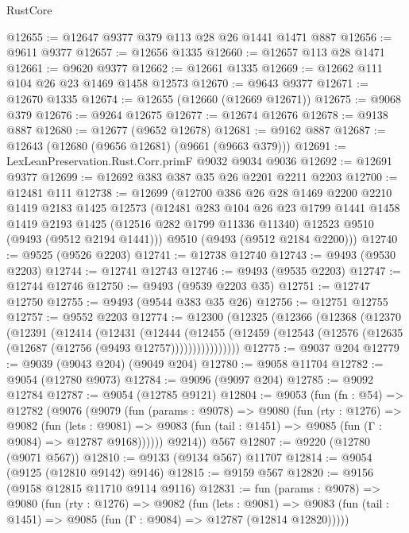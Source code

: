 \begin{lexlean}{RustCore}
\begin{coremodule}
@12655 := @12647 @9377 @379 @113 @28 @26 @1441 @1471 @887
@12656 := @9611 @9377
@12657 := @12656 @1335
@12660 := @12657 @113 @28 @1471
@12661 := @9620 @9377
@12662 := @12661 @1335
@12669 := @12662 @111 @104 @26 @23 @1469 @1458 @12573
@12670 := @9643 @9377
@12671 := @12670 @1335
@12674 := @12655 (@12660 (@12669 @12671))
@12675 := @9068 @379
@12676 := @9264 @12675
@12677 := @12674 @12676
@12678 := @9138 @887
@12680 := @12677 (@9652 @12678)
@12681 := @9162 @887
@12687 := @12643 (@12680 (@9656 @12681) (@9661 (@9663 @379)))
@12691 := LexLeanPreservation.Rust.Corr.primF @9032 @9034 @9036
@12692 := @12691 @9377
@12699 := @12692 @383 @387 @35 @26 @2201 @2211 @2203
@12700 := @12481 @111
@12738 := @12699
    (@12700
      @386
      @26
      @28
      @1469
      @2200
      @2210
      @1419
      @2183
      @1425
      @12573
      (@12481
        @283
        @104
        @26
        @23
        @1799
        @1441
        @1458
        @1419
        @2193
        @1425
        (@12516 @282 @1799 @11336 @11340)
        @12523
        @9510
        (@9493 (@9512 @2194 @1441)))
      @9510
      (@9493 (@9512 @2184 @2200)))
@12740 := @9525 (@9526 @2203)
@12741 := @12738 @12740
@12743 := @9493 (@9530 @2203)
@12744 := @12741 @12743
@12746 := @9493 (@9535 @2203)
@12747 := @12744 @12746
@12750 := @9493 (@9539 @2203 @35)
@12751 := @12747 @12750
@12755 := @9493 (@9544 @383 @35 @26)
@12756 := @12751 @12755
@12757 := @9552 @2203
@12774 := @12300
    (@12325
      (@12366
        (@12368
          (@12370
            (@12391
              (@12414
                (@12431
                  (@12444
                    (@12455
                      (@12459 (@12543 (@12576 (@12635 (@12687 (@12756 (@9493 @12757))))))))))))))))
@12775 := @9037 @204
@12779 := @9039 (@9043 @204) (@9049 @204)
@12780 := @9058 @11704
@12782 := @9054 (@12780 @9073)
@12784 := @9096 (@9097 @204)
@12785 := @9092 @12784
@12787 := @9054 (@12785 @9121)
@12804 := @9053
    (fun (fn : @54) =>
    @12782
      (@9076
        (@9079
          (fun (params : @9078) =>
          @9080
            (fun (rty : @1276) =>
            @9082
              (fun (lets : @9081) =>
              @9083 (fun (tail : @1451) => @9085 (fun (Γ : @9084) => @12787 @9168))))))
        @9214))
    @567
@12807 := @9220 (@12780 (@9071 @567))
@12810 := @9133 (@9134 @567) @11707
@12814 := @9054 (@9125 (@12810 @9142) @9146)
@12815 := @9159 @567
@12820 := @9156 (@9158 @12815 @11710 @9114 @9116)
@12831 := fun (params : @9078) =>
  @9080
    (fun (rty : @1276) =>
    @9082
      (fun (lets : @9081) =>
      @9083 (fun (tail : @1451) => @9085 (fun (Γ : @9084) => @12787 (@12814 @12820)))))

\end{coremodule}
\end{lexlean}
